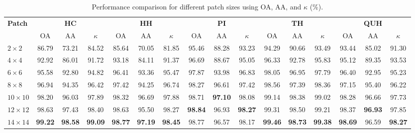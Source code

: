 \begin{table}[!ht]
\caption{Performance comparison for different patch sizes using OA, AA, and $\kappa$ (\%).}
\centering
\begin{adjustbox}{max width=\linewidth}
\begin{tabular}{|l|ccc|ccc|ccc|ccc|ccc|}
\hline
\multirow{2}{*}{\textbf{Patch}}
& \multicolumn{3}{c|}{\textbf{HC}} & \multicolumn{3}{c|}{\textbf{HH}} & \multicolumn{3}{c|}{\textbf{PI}} & \multicolumn{3}{c|}{\textbf{TH}} & \multicolumn{3}{c|}{\textbf{QUH}} \\ \cline{2-16}

& OA & AA & $\kappa$ & OA & AA & $\kappa$ & OA & AA & $\kappa$ & OA & AA & $\kappa$ & OA & AA & $\kappa$ \\
\hline

\(2 \times 2\) & 86.79 & 73.21 & 84.52 & 85.64 & 70.05 & 81.85 & 95.46 & 88.28 & 93.23 & 94.29 & 90.66 & 93.49 & 93.44 & 85.02 & 91.30 \\ \hline

\(4 \times 4\) & 92.92 & 86.01 & 91.72 & 93.18 & 84.11 & 91.37 & 96.69 & 88.67 & 95.05 & 96.33 & 92.78 & 95.83 & 95.12 & 89.35 & 93.53 \\ \hline

\(6 \times 6\) & 95.58 & 92.80 & 94.82 & 96.41 & 93.36 & 95.47 & 97.87 & 93.98 & 96.83 & 98.05 & 96.95 & 97.79 & 96.40 & 92.95 & 95.23 \\ \hline

\(8 \times 8\) & 96.94 & 94.35 & 96.42 & 97.42 & 94.25 & 96.74 & 98.27 & 96.61 & 97.42 & 98.56 & 97.39 & 98.36 & 97.15 & 95.40 & 96.22 \\ \hline

\(10 \times 10\) & 98.20 & 96.03 & 97.89 & 98.32 & 96.69 & 97.88 & 98.71 & \textbf{97.10} & 98.08 & 99.14 & 98.38 & 99.02 & 98.28 & 96.66 & 97.73 \\ \hline

\(12 \times 12\) & 98.63 & 97.43 & 98.40 & 98.63 & 95.50 & 98.27 & \textbf{98.84} & 96.93 & \textbf{98.27} & 99.31 & 98.50 & 99.21 & 98.37 & \textbf{96.93} &97.85 \\ \hline

\(14 \times 14\) & \textbf{99.22} & \textbf{98.58} & \textbf{99.09} & \textbf{98.77} & \textbf{97.19} & \textbf{98.45} & 98.77 & 96.57 & 98.17 & \textbf{99.46} & \textbf{98.73} & \textbf{99.38} & \textbf{98.69} & 96.59 & \textbf{98.27} \\ \hline

\end{tabular}
\end{adjustbox}
\label{tab:patch_acc}
\end{table}










